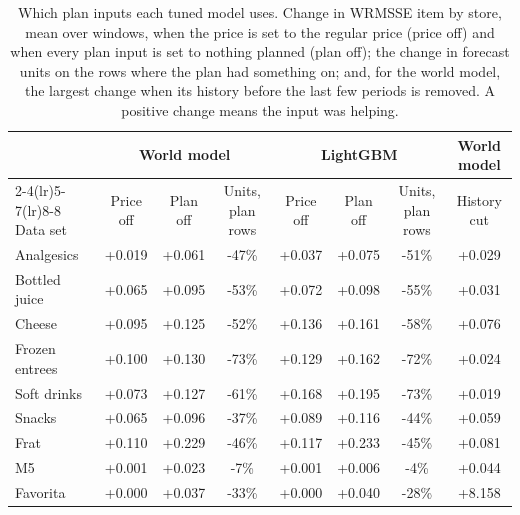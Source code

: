 \begin{table}[t]
\centering\footnotesize\setlength{\tabcolsep}{4pt}
\caption{Which plan inputs each tuned model uses. Change in WRMSSE item by store, mean over windows, when the price
is set to the regular price (price off) and when every plan input is set to nothing planned (plan off); the change
in forecast units on the rows where the plan had something on; and, for the world model, the largest change when its
history before the last few periods is removed. A positive change means the input was helping.}
\label{tab:sup-perturbation}
\begin{tabular}{l ccc ccc c}
\toprule
 & \multicolumn{3}{c}{World model} & \multicolumn{3}{c}{LightGBM} & World model\\
\cmidrule(lr){2-4}\cmidrule(lr){5-7}\cmidrule(lr){8-8}
Data set & Price off & Plan off & Units, plan rows & Price off & Plan off & Units, plan rows & History cut\\
\midrule
Analgesics & +0.019 & +0.061 & -47\% & +0.037 & +0.075 & -51\% & +0.029 \\
Bottled juice & +0.065 & +0.095 & -53\% & +0.072 & +0.098 & -55\% & +0.031 \\
Cheese & +0.095 & +0.125 & -52\% & +0.136 & +0.161 & -58\% & +0.076 \\
Frozen entrees & +0.100 & +0.130 & -73\% & +0.129 & +0.162 & -72\% & +0.024 \\
Soft drinks & +0.073 & +0.127 & -61\% & +0.168 & +0.195 & -73\% & +0.019 \\
Snacks & +0.065 & +0.096 & -37\% & +0.089 & +0.116 & -44\% & +0.059 \\
Frat & +0.110 & +0.229 & -46\% & +0.117 & +0.233 & -45\% & +0.081 \\
M5 & +0.001 & +0.023 & -7\% & +0.001 & +0.006 & -4\% & +0.044 \\
Favorita & +0.000 & +0.037 & -33\% & +0.000 & +0.040 & -28\% & +8.158 \\
\bottomrule
\end{tabular}
\end{table}
